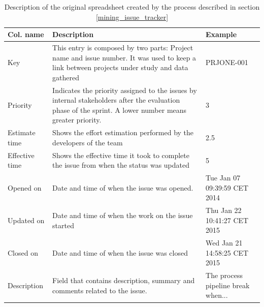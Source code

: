 \begin{table}[htb]
			\centering
			\renewcommand{\arraystretch}{1.2}
			\tabulinesep=1.2mm
            \caption[Original spreadsheet description]{Description of the original spreadsheet created by the process described in section \ref{mining_issue_tracker}}
            \label{tab:spreadsheet_description}
            
			\begin{tabu} to \textwidth {|X|X[4]|X|}
			    
				\hline
				\textbf{Col. name} & \textbf{Description} & \textbf{Example} \\ \hline
				
				Key & This entry is composed by two parts: Project name and issue number. It was used to keep a link between projects under study and data gathered & PRJONE-001 \\ \hline
				
				Priority & Indicates the priority assigned to the issues by internal stakeholders after the evaluation phase of the sprint. A lower number means greater priority. & 3 \\ \hline
				
				Estimate time & Shows the effort estimation performed by the developers of the team & 2.5 \\ \hline
				
				Effective time & Shows the effective time it took to complete the issue from when the status was updated & 5 \\ \hline
				
				Opened on & Date and time of when the issue was opened. & Tue Jan 07 09:39:59 CET 2014 \\ \hline
				
				Updated on & Date and time of when the work on the issue started & Thu Jan 22 10:41:27 CET 2015  \\ \hline
				
				Closed on & Date and time of when the issue was closed & Wed Jan 21 14:58:25 CET 2015 \\ \hline
				
				Description & Field that contains description, summary and comments related to the issue. & The process pipeline break when... \\ \hline
				
			\end{tabu}		
		\end{table}




